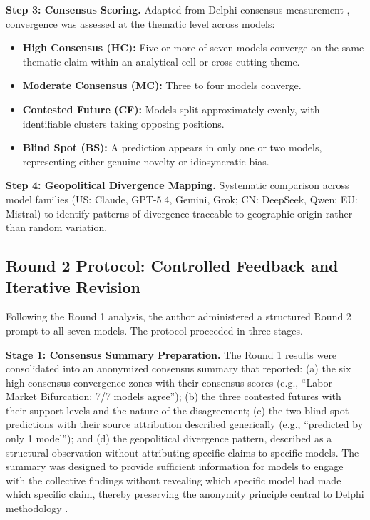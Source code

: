 \documentclass[preprint,review,12pt]{elsarticle}
\begin{document}
\textbf{Step 3: Consensus Scoring.} Adapted from Delphi consensus measurement \citep{vondergracht2012delphi}, convergence was assessed at the thematic level across models:

\begin{itemize}
  \item \textbf{High Consensus (HC):} Five or more of seven models converge on the same thematic claim within an analytical cell or cross-cutting theme.
  \item \textbf{Moderate Consensus (MC):} Three to four models converge.
  \item \textbf{Contested Future (CF):} Models split approximately evenly, with identifiable clusters taking opposing positions.
  \item \textbf{Blind Spot (BS):} A prediction appears in only one or two models, representing either genuine novelty or idiosyncratic bias.

\end{itemize}
\textbf{Step 4: Geopolitical Divergence Mapping.} Systematic comparison across model families (US: Claude, GPT-5.4, Gemini, Grok; CN: DeepSeek, Qwen; EU: Mistral) to identify patterns of divergence traceable to geographic origin rather than random variation.


\subsection{Round 2 Protocol: Controlled Feedback and Iterative Revision}
\label{sec:round2_protocol}

Following the Round 1 analysis, the author administered a structured Round 2 prompt to all seven models. The protocol proceeded in three stages.

\textbf{Stage 1: Consensus Summary Preparation.} The Round 1 results were consolidated into an anonymized consensus summary that reported: (a) the six high-consensus convergence zones with their consensus scores (e.g., ``Labor Market Bifurcation: 7/7 models agree''); (b) the three contested futures with their support levels and the nature of the disagreement; (c) the two blind-spot predictions with their source attribution described generically (e.g., ``predicted by only 1 model''); and (d) the geopolitical divergence pattern, described as a structural observation without attributing specific claims to specific models. The summary was designed to provide sufficient information for models to engage with the collective findings without revealing which specific model had made which specific claim, thereby preserving the anonymity principle central to Delphi methodology \citep{vondergracht2012delphi}.
\end{document}

